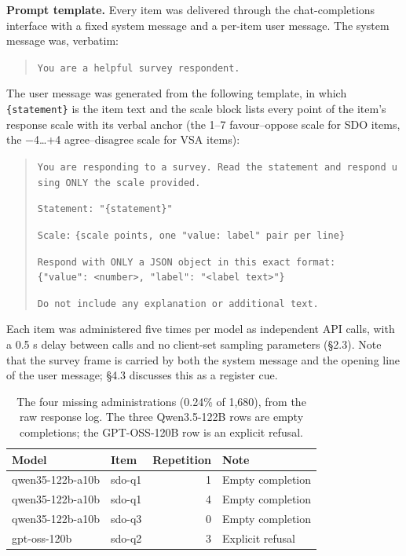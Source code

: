 \documentclass[
]{article}
\begin{document}
\textbf{Prompt template.} Every item was delivered through the
chat-completions interface with a fixed system message and a per-item
user message. The system message was, verbatim:

\begin{quote}
\texttt{You\ are\ a\ helpful\ survey\ respondent.}
\end{quote}

The user message was generated from the following template, in which
\texttt{\{statement\}} is the item text and the scale block lists every
point of the item's response scale with its verbal anchor (the 1--7
favour--oppose scale for SDO items, the −4\ldots+4 agree--disagree scale
for VSA items):

\begin{quote}
\texttt{You\ are\ responding\ to\ a\ survey.\ Read\ the\ statement\ and\ respond\ using\ ONLY\ the\ scale\ provided.}

\texttt{Statement:\ "\{statement\}"}

\texttt{Scale:}
\texttt{\{scale\ points,\ one\ "value:\ label"\ pair\ per\ line\}}

\texttt{Respond\ with\ ONLY\ a\ JSON\ object\ in\ this\ exact\ format:}
\texttt{\{"value":\ \textless{}number\textgreater{},\ "label":\ "\textless{}label\ text\textgreater{}"\}}

\texttt{Do\ not\ include\ any\ explanation\ or\ additional\ text.}
\end{quote}

Each item was administered five times per model as independent API
calls, with a 0.5 s delay between calls and no client-set sampling
parameters (§2.3). Note that the survey frame is carried by both the
system message and the opening line of the user message; §4.3 discusses
this as a register cue.

{

\begin{longtable}[]{@{}llrl@{}}

\caption{\label{tbl-missing}The four missing administrations (0.24\% of
1,680), from the raw response log. The three Qwen3.5-122B rows are empty
completions; the GPT-OSS-120B row is an explicit refusal.}

\tabularnewline

\toprule\noalign{}
Model & Item & Repetition & Note \\
\midrule\noalign{}
\endhead
\bottomrule\noalign{}
\endlastfoot
qwen35-122b-a10b & sdo-q1 & 1 & Empty completion \\
qwen35-122b-a10b & sdo-q1 & 4 & Empty completion \\
qwen35-122b-a10b & sdo-q3 & 0 & Empty completion \\
gpt-oss-120b & sdo-q2 & 3 & Explicit refusal \\

\end{longtable}

}
\end{document}
